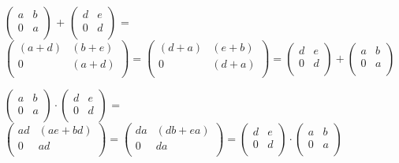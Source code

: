 \vspace{3 mm}
$\left(%
\begin{array}{cc}
  a & b \\
  0 & a \\
\end{array}%
\right)$ + 
    $\left(%
    \begin{array}{cc}
      d & e \\
      0 & d \\
    \end{array}%
    \right)$ = 
    $\left(%
    \begin{array}{cc}
      (a+d) & (b+e) \\
      0 & (a+d) \\
    \end{array}%
    \right) =
    \left(%
    \begin{array}{cc}
      (d+a) & (e+b) \\
      0 & (d+a) \\
    \end{array}%
    \right) =
    \left(%
    \begin{array}{cc}
      d & e \\
      0 & d \\
    \end{array}%
    \right) +
\left(%
\begin{array}{cc}
  a & b \\
  0 & a \\
\end{array}%
\right)$

$\left(%
\begin{array}{cc}
  a & b \\
  0 & a \\
\end{array}%
\right) \cdot 
    \left(%
    \begin{array}{cc}
      d & e \\
      0 & d \\
    \end{array}%
    \right)$ = 
    $\left(%
    \begin{array}{cc}
      ad & (ae + bd) \\
      0 & ad \\
    \end{array}%
    \right) =
    \left(%
    \begin{array}{cc}
      da & (db+ea) \\
      0 & da \\
    \end{array}%
    \right) =
    \left(%
    \begin{array}{cc}
      d & e \\
      0 & d \\
    \end{array}%
    \right) \cdot
    \left(%
\begin{array}{cc}
  a & b \\
  0 & a \\
\end{array}%
\right)$
\vspace{3 mm}

